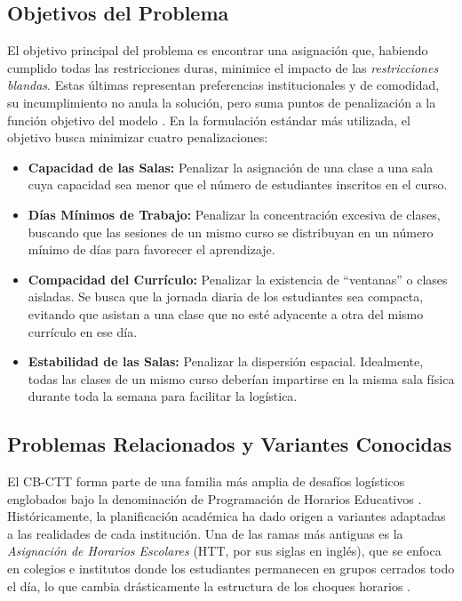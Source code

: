 \documentclass[letter, 10pt]{article}
\begin{document}
\subsection*{Objetivos del Problema}
El objetivo principal del problema es encontrar una asignación que, habiendo cumplido todas las restricciones duras, minimice el impacto de las \textit{restricciones blandas}. Estas últimas representan preferencias institucionales y de comodidad, su incumplimiento no anula la solución, pero suma puntos de penalización a la función objetivo del modelo \cite{digaspero2007, decesco2008}. En la formulación estándar más utilizada, el objetivo busca minimizar cuatro penalizaciones:
\begin{itemize}
    \item \textbf{Capacidad de las Salas:} Penalizar la asignación de una clase a una sala cuya capacidad sea menor que el número de estudiantes inscritos en el curso.
    \item \textbf{Días Mínimos de Trabajo:} Penalizar la concentración excesiva de clases, buscando que las sesiones de un mismo curso se distribuyan en un número mínimo de días para favorecer el aprendizaje.
    \item \textbf{Compacidad del Currículo:} Penalizar la existencia de ``ventanas'' o clases aisladas. Se busca que la jornada diaria de los estudiantes sea compacta, evitando que asistan a una clase que no esté adyacente a otra del mismo currículo en ese día.
    \item \textbf{Estabilidad de las Salas:} Penalizar la dispersión espacial. Idealmente, todas las clases de un mismo curso deberían impartirse en la misma sala física durante toda la semana para facilitar la logística.
\end{itemize}

\subsection*{Problemas Relacionados y Variantes Conocidas}
El CB-CTT forma parte de una familia más amplia de desafíos logísticos englobados bajo la denominación de Programación de Horarios Educativos \cite{ceschia2023}. Históricamente, la planificación académica ha dado origen a variantes adaptadas a las realidades de cada institución. Una de las ramas más antiguas es la \textit{Asignación de Horarios Escolares} (HTT, por sus siglas en inglés), que se enfoca en colegios e institutos donde los estudiantes permanecen en grupos cerrados todo el día, lo que cambia drásticamente la estructura de los choques horarios \cite{schaerf1999}. 
\end{document}
